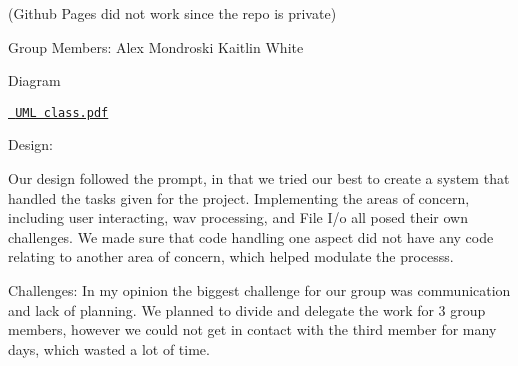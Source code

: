 \label{index_md_README}%
%
 (Github Pages did not work since the repo is private)

Group Members\+: Alex Mondroski Kaitlin White

Diagram

\href{https://github.com/cpe-unr/group-project-pt48/files/6424232/UML.class.pdf}{\texttt{ UML class.\+pdf}}

Design\+:

Our design followed the prompt, in that we tried our best to create a system that handled the tasks given for the project. Implementing the areas of concern, including user interacting, wav processing, and File I/o all posed their own challenges. We made sure that code handling one aspect did not have any code relating to another area of concern, which helped modulate the processs.

Challenges\+: In my opinion the biggest challenge for our group was communication and lack of planning. We planned to divide and delegate the work for 3 group members, however we could not get in contact with the third member for many days, which wasted a lot of time. 